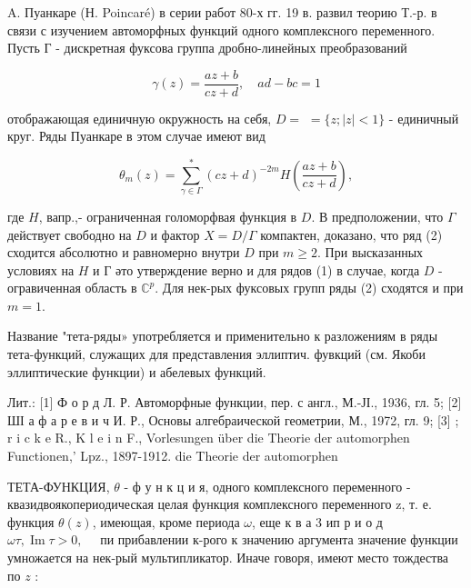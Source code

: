 \documentclass[10pt]{article}
\begin{document}
A. Пуанкаре (Н. Poincaré) в серии работ 80-х гг. 19 в. развил теорию Т.-р. в связи с изучением автоморфных функций одного комплексного переменного. Пусть Г - дискретная фуксова группа дробно-линейных преобразований



\[

\gamma(z)=\frac{a z+b}{c z+d}, \quad a d-b c=1

\]



отображающая единичную окружность на себя, $D=$ $=\{z ;|z|<1\}$ - единичный круг. Ряды Пуанкаре в этом случае имеют вид



\[

\theta_{m}(z)=\sum_{\gamma \in \Gamma}^{*}(c z+d)^{-2 m} H\left(\frac{a z+b}{c z+d}\right),

\]



где $H$, вапр.,- ограниченная голоморфвая функция в $D$. В предположении, что $\Gamma$ действует свободно на $D$ и фактор $X=D / \Gamma$ компактен, доказано, что ряд (2) сходится абсолютно и равномерно внутри $D$ при $m \geqslant 2$. При высказанных условиях на $H$ и Г әто утверждение верно и для рядов (1) в случае, когда $D$ - огравиченная область в $\mathbb{C}^{p}$. Для нек-рых фуксовых групп ряды (2) сходятся и при $m=1$.



Название "тета-ряды» употребляется и применительно к разложениям в ряды тета-функций, служащих для представления эллиптич. фувкций (см. Якоби эллиптические функции) и абелевых функций.



Лит.: [1] Ф о р д Л. Р. Автоморфные функции, пер. с англ., М.-ЈІ., 1936, гл. 5; [2] ШІ а ф а р е в и ч И. Р., Основы алгебраической геометрии, М., 1972, гл. 9; [3] ; r i c k e R., K l e i n F., Vorlesungen über die Theorie der automorphen Functionen,' Lpz., 1897-1912. die Theorie der automorphen



ТЕТА-ФУНКЦИЯ, $\theta$ - ф у н к ц и я, одного комплексного переменного - квазидвоякопериодическая целая функция комплексного переменного z, т. е. функция $\theta(z)$, имеющая, кроме периода $\omega$, еще к в а 3 ип р и о д $\omega \tau, \operatorname{Im} \tau>0, \quad$ пи прибавлении к-рого к значению аргумента значение функции умножается на нек-рый мультипликатор. Иначе говоря, имеют место тождества по $z$ :
\end{document}
